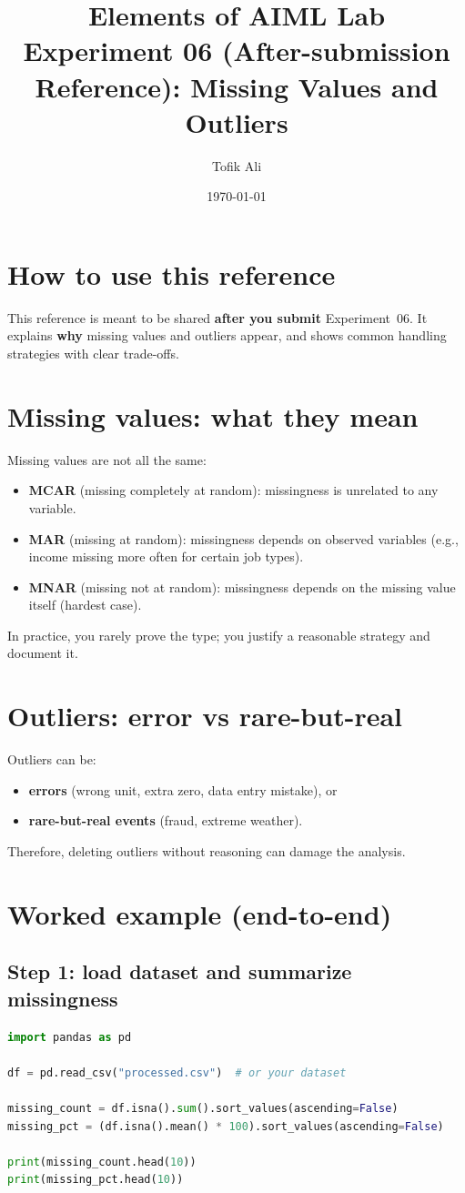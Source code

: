 \documentclass[11pt]{article}
\title{Elements of AIML Lab\\Experiment 06 (After-submission Reference): Missing Values and Outliers}
\author{Tofik Ali}
\date{\today}
\begin{document}
\maketitle
\tableofcontents

\section{How to use this reference}
This reference is meant to be shared \textbf{after you submit} Experiment~06.
It explains \textbf{why} missing values and outliers appear, and shows common handling strategies with clear trade-offs.

\section{Missing values: what they mean}
Missing values are not all the same:
\begin{itemize}[leftmargin=*]
  \item \textbf{MCAR} (missing completely at random): missingness is unrelated to any variable.
  \item \textbf{MAR} (missing at random): missingness depends on observed variables (e.g., income missing more often for certain job types).
  \item \textbf{MNAR} (missing not at random): missingness depends on the missing value itself (hardest case).
\end{itemize}
In practice, you rarely prove the type; you justify a reasonable strategy and document it.

\section{Outliers: error vs rare-but-real}
Outliers can be:
\begin{itemize}[leftmargin=*]
  \item \textbf{errors} (wrong unit, extra zero, data entry mistake), or
  \item \textbf{rare-but-real events} (fraud, extreme weather).
\end{itemize}
Therefore, deleting outliers without reasoning can damage the analysis.

\section{Worked example (end-to-end)}
\subsection{Step 1: load dataset and summarize missingness}
\begin{lstlisting}[language=Python]
import pandas as pd

df = pd.read_csv("processed.csv")  # or your dataset

missing_count = df.isna().sum().sort_values(ascending=False)
missing_pct = (df.isna().mean() * 100).sort_values(ascending=False)

print(missing_count.head(10))
print(missing_pct.head(10))
\end{lstlisting}
\end{document}
